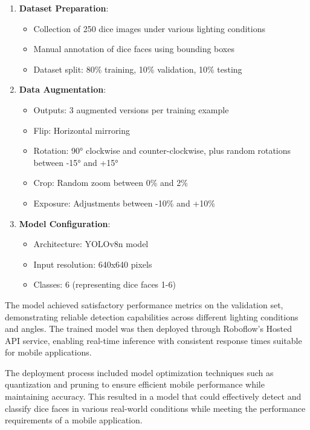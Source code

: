 \begin{enumerate}
    \item \textbf{Dataset Preparation}:
    \begin{itemize}
        \item Collection of 250 dice images under various lighting conditions
        \item Manual annotation of dice faces using bounding boxes
        \item Dataset split: 80\% training, 10\% validation, 10\% testing
    \end{itemize}

    \item \textbf{Data Augmentation}:
    \begin{itemize}
        \item Outputs: 3 augmented versions per training example
        \item Flip: Horizontal mirroring
        \item Rotation: 90° clockwise and counter-clockwise, plus random rotations between -15° and +15°
        \item Crop: Random zoom between 0\% and 2\%
        \item Exposure: Adjustments between -10\% and +10\%
    \end{itemize}

    \item \textbf{Model Configuration}:
    \begin{itemize}
        \item Architecture: YOLOv8n model
        \item Input resolution: 640x640 pixels
        \item Classes: 6 (representing dice faces 1-6)
    \end{itemize}
\end{enumerate}

The model achieved satisfactory performance metrics on the validation set, demonstrating reliable detection capabilities across different lighting conditions and angles. The trained model was then deployed through Roboflow's Hosted API service, enabling real-time inference with consistent response times suitable for mobile applications.

The deployment process included model optimization techniques such as quantization and pruning to ensure efficient mobile performance while maintaining accuracy. This resulted in a model that could effectively detect and classify dice faces in various real-world conditions while meeting the performance requirements of a mobile application.

